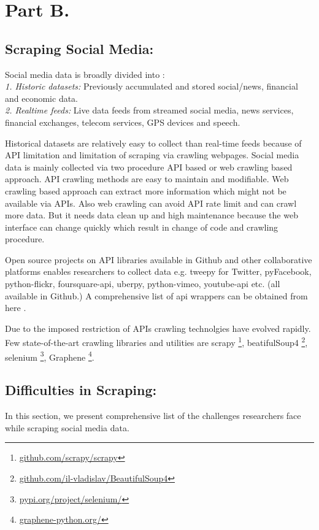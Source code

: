 \section{Part B.}
\subsection*{Scraping Social Media:}
Social media data is broadly divided into
 \cite{batrinca2015social} :\\
{\em1. Historic datasets:} Previously accumulated and stored social/news, financial and economic data. \\
{\em2. Realtime feeds:} Live data feeds from streamed social media, news services, financial exchanges, telecom services, GPS devices and speech.

Historical datasets are relatively easy to collect than real-time feeds because of API limitation and limitation of scraping via crawling webpages. Social media data is mainly collected via two procedure API based or web crawling based approach. API crawling methods are easy to maintain and modifiable. Web crawling based approach can extract more information which might not be available via APIs. Also web crawling can avoid API rate limit and can crawl more data. But it needs data clean up and high maintenance because the web interface can change quickly which result in change of code and crawling procedure.

Open source projects on API libraries available in Github and other collaborative platforms enables researchers to collect data e.g. tweepy for Twitter, pyFacebook, python-flickr, foursquare-api, uberpy, python-vimeo, youtube-api etc. (all available in Github.) A comprehensive list of api wrappers can be obtained from here \cite{api_wrappers}.

Due to the imposed restriction of APIs crawling technolgies have evolved rapidly. Few state-of-the-art crawling libraries and utilities are scrapy \footnote{\href{https://github.com/scrapy/scrapy}{github.com/scrapy/scrapy}}, beatifulSoup4 \footnote{\href{https://github.com/il-vladislav/BeautifulSoup4}{github.com/il-vladislav/BeautifulSoup4}}, selenium \footnote{\href{https://pypi.org/project/selenium/}{pypi.org/project/selenium/}}, Graphene \footnote{\href{https://graphene-python.org/}{graphene-python.org/}}.


\subsection*{Difficulties in Scraping:}
In this section, we present comprehensive list of the challenges researchers face while scraping social media data.

